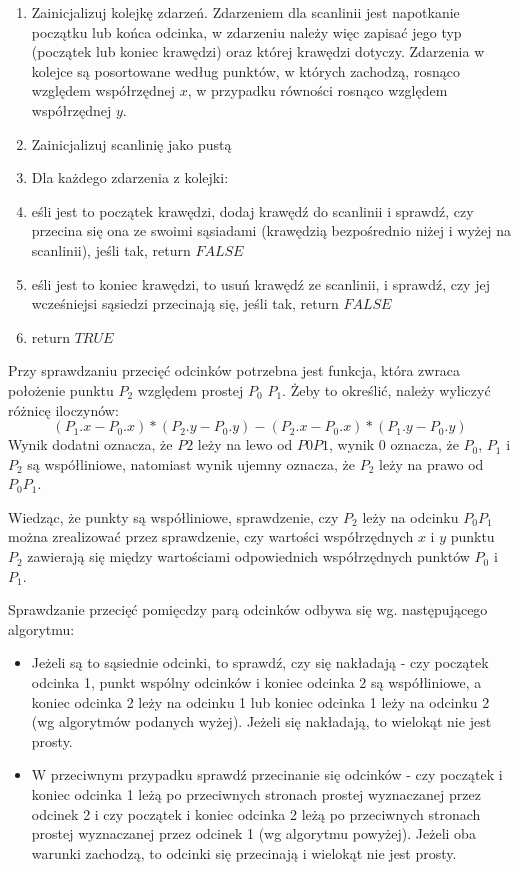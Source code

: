 \documentclass{article}
\newcommand{\tab}[1]{\hspace{.05\textwidth}\rlap{#1}}
\begin{document}
\begin{enumerate}
    \item Zainicjalizuj kolejkę zdarzeń. Zdarzeniem dla scanlinii jest napotkanie początku lub końca odcinka, w zdarzeniu należy więc zapisać jego typ (początek lub koniec krawędzi) oraz której krawędzi dotyczy. Zdarzenia w kolejce są posortowane według punktów, w których zachodzą, rosnąco względem współrzędnej $x$, w przypadku równości rosnąco względem współrzędnej $y$.
    
    \item Zainicjalizuj scanlinię jako pustą
    
    \item Dla każdego zdarzenia z kolejki:
    
    \item \tab jeśli jest to początek krawędzi, dodaj krawędź do scanlinii i sprawdź, czy przecina się ona ze swoimi sąsiadami (krawędzią bezpośrednio niżej i wyżej na scanlinii), jeśli tak, return $FALSE$
    
    \item \tab jeśli jest to koniec krawędzi, to usuń krawędź ze scanlinii, i sprawdź, czy jej wcześniejsi sąsiedzi przecinają się, jeśli tak, return $FALSE$
    
    \item return $TRUE$
\end{enumerate}

Przy sprawdzaniu przecięć odcinków potrzebna jest funkcja, która zwraca położenie punktu $P_2$ względem prostej $P_0$ $P_1$. Żeby to określić, należy wyliczyć różnicę iloczynów:
$$ (P_1.x - P_0.x)*(P_2.y - P_0.y) - (P_2.x - P_0.x)*(P_1.y -  P_0.y) $$
Wynik dodatni oznacza, że $P2$ leży na lewo od $P0P1$, wynik 0 oznacza, że $P_0$, $P_1$ i $P_2$ są współliniowe, natomiast wynik ujemny oznacza, że $P_2$ leży na prawo od $P_0P_1$.

Wiedząc, że punkty są współliniowe, sprawdzenie, czy $P_2$ leży na odcinku $P_0P_1$ można zrealizować przez sprawdzenie, czy wartości współrzędnych $x$ i $y$ punktu $P_2$ zawierają się między wartościami odpowiednich współrzędnych punktów $P_0$ i $P_1$. 

Sprawdzanie przecięć pomięcdzy parą odcinków odbywa się wg. następującego algorytmu:

\begin{itemize}
    \item Jeżeli są to sąsiednie odcinki, to sprawdź, czy się nakładają - czy początek odcinka 1, punkt wspólny odcinków i koniec odcinka 2 są współliniowe, a koniec odcinka 2 leży na odcinku 1 lub koniec odcinka 1 leży na odcinku 2 (wg algorytmów podanych wyżej). Jeżeli się nakładają, to wielokąt nie jest prosty.
    \item W przeciwnym przypadku sprawdź przecinanie się odcinków - czy początek i koniec odcinka 1 leżą po przeciwnych stronach prostej wyznaczanej przez odcinek 2 i czy początek i koniec odcinka 2 leżą po przeciwnych stronach prostej wyznaczanej przez odcinek 1 (wg algorytmu powyżej). Jeżeli oba warunki zachodzą, to odcinki się przecinają i wielokąt nie jest prosty.
\end{itemize}
\end{document}
